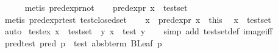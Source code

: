 \begin{isabellebody}
\ \ \ \ \isamarkupfalse%
\ {}metis\ pred{}expr{}not{}\isanewline
\ \ \isamarkupfalse%
\ {}{}{}pred{}expr\ x{}{}\ {}\ test{}set{}\isanewline
\ \ \ \ \isamarkupfalse%
\ {}metis\ pred{}expr{}test\ test{}closed{}set{}\isanewline
\ \ \isamarkupfalse%
\ {}x\ {}\ pred{}expr\ x{}{}\ \ this\ \isamarkupfalse%
\ {}{}x\ {}\ test{}set{}\isanewline
\ \ \ \ \isamarkupfalse%
\ auto\isanewline
{}\isamarkupfalse%
%
\endisatagproof
{\isafoldproof}%
%
\isadelimproof
\isanewline
%
\endisadelimproof
\isanewline
{}\isamarkupfalse%
\ test{}ex{}\ {}x\ {}\ test{}set\ {}\ {}y{}\ x\ {}\ test\ y{}\isanewline
%
\isadelimproof
\ \ %
\endisadelimproof
%
\isatagproof
{}\isamarkupfalse%
\ {}simp\ add{}\ test{}set{}def\ image{}iff{}%
\endisatagproof
{\isafoldproof}%
%
\isadelimproof
\isanewline
%
\endisadelimproof
\isanewline
{}\isamarkupfalse%
\ pred{}test{}\ {}pred\ p\ {}\ test\ {}abs{}bterm\ {}BLeaf\ p{}{}{}\isanewline

\end{isabellebody}
